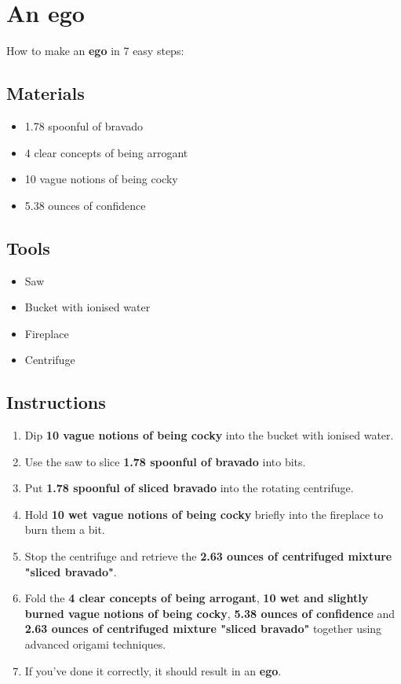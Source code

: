 \documentclass{article}
\begin{document}
\section{An ego}How to make an \textbf{ego} in 7 easy steps:

\subsection{Materials}\begin{itemize}
\item 
1.78 spoonful of bravado
\item 
4 clear concepts of being arrogant
\item 
10 vague notions of being cocky
\item 
5.38 ounces of confidence
\end{itemize}
\subsection{Tools}\begin{itemize}
\item 
Saw
\item 
Bucket with ionised water
\item 
Fireplace
\item 
Centrifuge
\end{itemize}
\subsection{Instructions}\begin{enumerate}
\item 
Dip \textbf{10 vague notions of being cocky} into the bucket with ionised water.
\item 
Use the saw to slice \textbf{1.78 spoonful of bravado} into bits.
\item 
Put \textbf{1.78 spoonful of sliced bravado} into the rotating centrifuge.
\item 
Hold \textbf{10 wet vague notions of being cocky} briefly into the fireplace to burn them a bit.
\item 
Stop the centrifuge and retrieve the \textbf{2.63 ounces of centrifuged mixture "sliced bravado"}.
\item 
Fold the \textbf{4 clear concepts of being arrogant}, \textbf{10 wet and slightly burned vague notions of being cocky}, \textbf{5.38 ounces of confidence} and \textbf{2.63 ounces of centrifuged mixture "sliced bravado"} together using advanced origami techniques.
\item 
If you've done it correctly, it should result in an \textbf{ego}.
\end{enumerate}
\newpage
\end{document}

